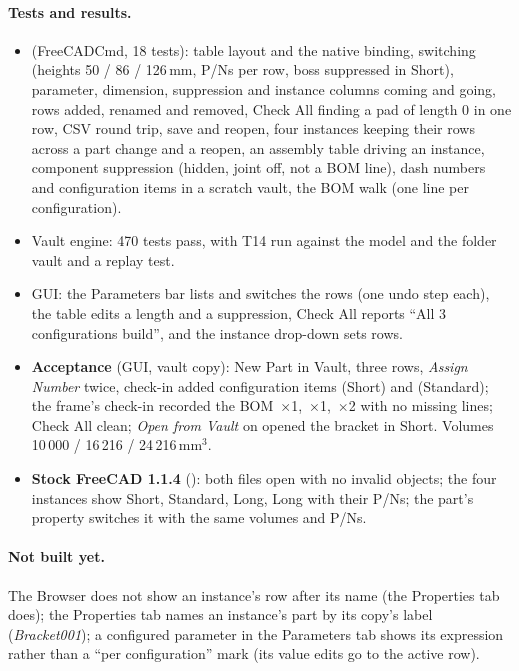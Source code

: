 \paragraph{Tests and results.}
\begin{itemize}
  \item {} (FreeCADCmd, 18 tests): table layout and the native binding, switching
        (heights 50 / 86 / 126\,mm, P/Ns per row, boss suppressed in Short), parameter, dimension,
        suppression and instance columns coming and going, rows added, renamed and removed, Check All
        finding a pad of length 0 in one row, CSV round trip, save and reopen, four instances keeping
        their rows across a part change and a reopen, an assembly table driving an instance, component
        suppression (hidden, joint off, not a BOM line), dash numbers and configuration items in a scratch
        vault, the BOM walk (one line per configuration).
  \item Vault engine: 470 tests pass, with T14 run against the model and the folder vault and a replay test.
  \item GUI: the Parameters bar lists and switches the rows (one undo step each), the table edits a length
        and a suppression, Check All reports ``All 3 configurations build'', and the instance drop-down sets
        rows.
  \item \textbf{Acceptance} (GUI, vault copy): New Part in Vault, three rows, \emph{Assign Number} twice,
        check-in added configuration items  (Short) and  (Standard); the frame's
        check-in recorded the BOM \,$\times$1, \,$\times$1, \,$\times$2 with no
        missing lines; Check All clean; \emph{Open from Vault} on  opened the bracket in Short.
        Volumes 10\,000 / 16\,216 / 24\,216\,mm$^3$.
  \item \textbf{Stock FreeCAD 1.1.4} (): both files open with no invalid
        objects; the four instances show Short, Standard, Long, Long with their P/Ns; the part's
         property switches it with the same volumes and P/Ns.
\end{itemize}

\paragraph{Not built yet.} The Browser does not show an instance's row after its name (the Properties tab
does); the Properties tab names an instance's part by its copy's label (\emph{Bracket001}); a configured
parameter in the Parameters tab shows its expression  rather than a
``per configuration'' mark (its value edits go to the active row).

